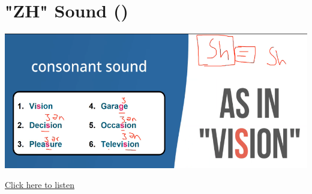 \section{"ZH" Sound (\textipa{/\textyogh/})}
\begin{center}
\includegraphics[width=1\textwidth]{images/zh_portraint.png}
\end{center}

\href{https://drive.google.com/file/d/1J5EL2Z3BKZqDA29fe09p-RAgaJgx5Y2W/view?usp=sharing}{Click here to listen}

